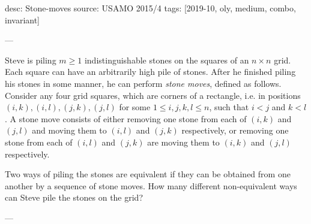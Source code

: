 desc: Stone-moves
source: USAMO 2015/4
tags: [2019-10, oly, medium, combo, invariant]

---

Steve is piling $m\ge 1$ indistinguishable stones on the squares of an $n\times n$ grid. Each square can have an arbitrarily high pile of stones. After he finished piling his stones in some manner, he can perform \emph{stone moves}, defined as follows. Consider any four grid squares, which are corners of a rectangle, i.e. in positions $(i,k),(i,l),(j,k),(j,l)$ for some $1\le i,j,k,l\le n$, such that $i<j$ and $k<l$. A stone move consists of either removing one stone from each of $(i,k)$ and $(j,l)$ and moving them to $(i,l)$ and $(j,k)$ respectively, or removing one stone from each of $(i,l)$ and $(j,k)$ are moving them to $(i,k)$ and $(j,l)$ respectively.

Two ways of piling the stones are equivalent if they can be obtained from one another by a sequence of stone moves. How many different non-equivalent ways can Steve pile the stones on the grid?

---

